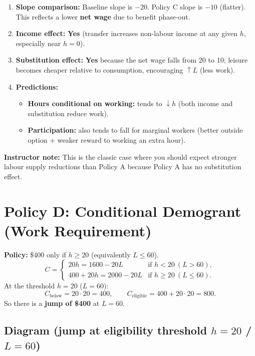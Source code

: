 \documentclass[12pt]{article}
\begin{document}
\begin{enumerate}
\item \textbf{Slope comparison:} Baseline slope is \(-20\). Policy C slope is \(-10\) (flatter). This reflects a lower \textbf{net wage} due to benefit phase-out.
\item \textbf{Income effect:} \textbf{Yes} (transfer increases non-labour income at any given \(h\), especially near \(h=0\)).
\item \textbf{Substitution effect:} \textbf{Yes} because the net wage falls from 20 to 10; leisure becomes cheaper relative to consumption, encouraging \(\uparrow L\) (less work).
\item \textbf{Predictions:}
\begin{itemize}
\item \textbf{Hours conditional on working:} tends to \(\downarrow h\) (both income and substitution reduce work).
\item \textbf{Participation:} also tends to fall for marginal workers (better outside option + weaker reward to working an extra hour).
\end{itemize}
\end{enumerate}

\textbf{Instructor note:} This is the classic case where you should expect stronger labour supply reductions than Policy A because Policy A has no substitution effect.

\newpage

\section*{Policy D: Conditional Demogrant (Work Requirement)}

\textbf{Policy:} \$400 only if \(h\ge 20\) (equivalently \(L \le 60\)).
\[
C =
\begin{cases}
20h = 1600-20L & \text{if } h<20 \ (L>60),\\
400 + 20h = 2000-20L & \text{if } h\ge 20 \ (L\le 60).
\end{cases}
\]
At the threshold \(h=20\) (\(L=60\)):
\[
C_{\text{below}} = 20\cdot 20 = 400,\qquad
C_{\text{eligible}} = 400 + 20\cdot 20 = 800.
\]
So there is a \textbf{jump of \$400} at \(L=60\).

\subsection*{Diagram (jump at eligibility threshold $h=20$ / $L=60$)}
\end{document}
